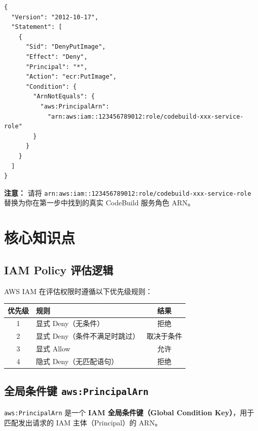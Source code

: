 \documentclass[12pt, a4paper]{article}
\begin{document}
\begin{lstlisting}[language={}]
{
  "Version": "2012-10-17",
  "Statement": [
    {
      "Sid": "DenyPutImage",
      "Effect": "Deny",
      "Principal": "*",
      "Action": "ecr:PutImage",
      "Condition": {
        "ArnNotEquals": {
          "aws:PrincipalArn":
            "arn:aws:iam::123456789012:role/codebuild-xxx-service-role"
        }
      }
    }
  ]
}
\end{lstlisting}

\begin{warningbox}
  \textbf{注意：} 请将 \texttt{arn:aws:iam::123456789012:role/codebuild-xxx-service-role}
  替换为你在第一步中找到的真实 CodeBuild 服务角色 ARN。
\end{warningbox}

\section{核心知识点}

\subsection{IAM Policy 评估逻辑}

AWS IAM 在评估权限时遵循以下优先级规则：

\begin{center}
\begin{tabular}{clc}
  \toprule
  \textbf{优先级} & \textbf{规则} & \textbf{结果} \\
  \midrule
  1 & 显式 Deny（无条件） & 拒绝 \\
  2 & 显式 Deny（条件不满足时跳过） & 取决于条件 \\
  3 & 显式 Allow & 允许 \\
  4 & 隐式 Deny（无匹配语句） & 拒绝 \\
  \bottomrule
\end{tabular}
\end{center}

\subsection{全局条件键 \texttt{aws:PrincipalArn}}

\texttt{aws:PrincipalArn} 是一个 \textbf{IAM 全局条件键（Global Condition Key）}，用于匹配发出请求的 IAM 主体（Principal）的 ARN。
\end{document}
